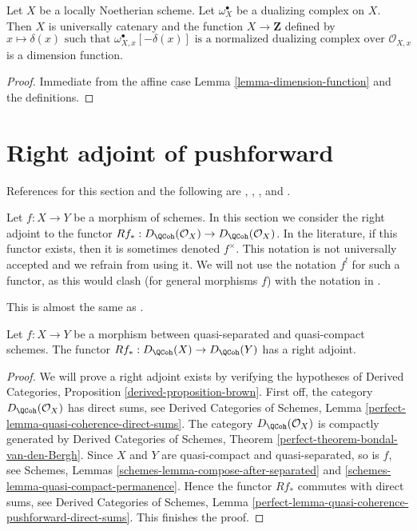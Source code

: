 \begin{lemma}
\label{lemma-dimension-function-scheme}
Let $X$ be a locally Noetherian scheme. Let $\omega_X^\bullet$
be a dualizing complex on $X$. Then $X$ is universally catenary
and the function
$X \to \mathbf{Z}$ defined by
$$
x \longmapsto \delta(x)\text{ such that }
\omega_{X, x}^\bullet[-\delta(x)]
\text{ is a normalized dualizing complex over }
\mathcal{O}_{X, x}
$$
is a dimension function.
\end{lemma}

\begin{proof}
Immediate from the affine case
Lemma \ref{lemma-dimension-function}
and the definitions.
\end{proof}






\section{Right adjoint of pushforward}
\label{section-twisted-inverse-image}

\noindent
References for this section and the following are
\cite{Neeman-Grothendieck}, \cite{LN},
\cite{Lipman-notes}, and \cite{Neeman-improvement}.

\medskip\noindent
Let $f : X \to Y$ be a morphism of schemes.
In this section we consider the right adjoint to the functor
$Rf_* : D_\QCoh(\mathcal{O}_X) \to D_\QCoh(\mathcal{O}_X)$.
In the literature, if this functor exists, then it is sometimes
denoted $f^{\times}$. This notation is not universally accepted and we refrain
from using it. We will not use the notation $f^!$ for such a functor,
as this would clash (for general morphisms $f$) with the notation in
\cite{RD}.

\begin{lemma}
\label{lemma-twisted-inverse-image}
\begin{reference}
This is almost the same as \cite[Example 4.2]{Neeman-Grothendieck}.
\end{reference}
Let $f : X \to Y$ be a morphism between quasi-separated and quasi-compact
schemes. The functor $Rf_* : D_\QCoh(X) \to D_\QCoh(Y)$ has a
right adjoint.
\end{lemma}

\begin{proof}
We will prove a right adjoint exists by verifying the hypotheses of
Derived Categories, Proposition \ref{derived-proposition-brown}.
First off, the category $D_\QCoh(\mathcal{O}_X)$ has direct sums, see
Derived Categories of Schemes, Lemma
\ref{perfect-lemma-quasi-coherence-direct-sums}.
The category $D_\QCoh(\mathcal{O}_X)$ is compactly generated by
Derived Categories of Schemes, Theorem
\ref{perfect-theorem-bondal-van-den-Bergh}.
Since $X$ and $Y$ are quasi-compact and quasi-separated, so is $f$, see
Schemes, Lemmas \ref{schemes-lemma-compose-after-separated} and
\ref{schemes-lemma-quasi-compact-permanence}.
Hence the functor $Rf_*$ commutes with direct sums, see
Derived Categories of Schemes, Lemma
\ref{perfect-lemma-quasi-coherence-pushforward-direct-sums}.
This finishes the proof.
\end{proof}

